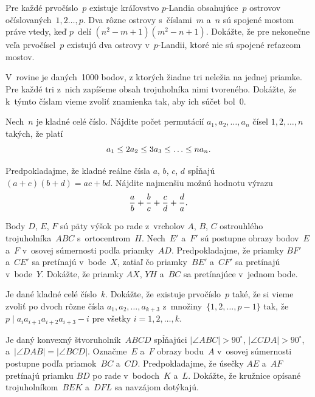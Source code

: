 {%

Pre každé prvočíslo~$p$ existuje kráľovstvo $p$-Landia obsahujúce~$p$ ostrovov očíslovaných~$1,2\ldots,p$. Dva rôzne ostrovy s~číslami~$m$ a~$n$ sú spojené mostom práve vtedy, keď $p$~delí $(n^2-m+1)(m^2-n+1)$. Dokážte, že pre nekonečne veľa prvočísel~$p$ existujú dva ostrovy v~$p$-Landii, ktoré nie sú spojené reťazcom mostov.
}

{%

V~rovine je daných~1000 bodov, z ktorých žiadne tri neležia na jednej priamke. Pre každé tri z~nich zapíšeme obsah trojuholníka nimi tvoreného. Dokážte, že k~týmto číslam vieme zvoliť znamienka tak, aby ich súčet bol~0.
}

{%

Nech~$n$ je kladné celé číslo. Nájdite počet permutácií $a_1,a_2,\ldots,a_n$ čísel $1,2,\ldots,n$ takých, že platí
$$
a_1 \leq 2a_2 \leq 3a_3 \leq \ldots \leq n a_n.
\belowdisplayskip0pt
$$
}

{%

Predpokladajme, že kladné reálne čísla $a$, $b$, $c$, $d$ spĺňajú $(a+c)(b+d) = ac + bd$. Nájdite najmenšiu možnú hodnotu výrazu
$$
\frac ab + \frac bc + \frac cd + \frac da.
\belowdisplayskip0pt
$$
}

{%

Body $D$, $E$, $F$ sú päty výšok po rade z~vrcholov $A$, $B$, $C$ ostrouhlého trojuholníka~$ABC$ s~ortocentrom~$H$. Nech~$E'$ a~$F'$ sú postupne obrazy bodov~$E$ a~$F$ v~osovej súmernosti podľa priamky~$AD$. Predpokladajme, že priamky $BF'$ a~$CE'$ sa pretínajú v~bode~$X$, zatiaľ čo priamky~$BE'$ a~$CF'$ sa pretínajú v~bode~$Y$. Dokážte, že priamky $AX$, $YH$ a~$BC$ sa pretínajúce v~jednom bode.
}

{%

Je dané kladné celé číslo~$k$. Dokážte, že existuje prvočíslo~$p$ také, že si vieme zvoliť po dvoch rôzne čísla $a_1,a_2,\ldots,a_{k+3}$ z~množiny~$\{1,2,\ldots,p-1\}$ tak, že $p \mid a_ia_{i+1}a_{i+2}a_{i+3}-i$ pre všetky $i=1,2,\ldots,k$.
}

{%

Je daný konvexný štvoruholník~$ABCD$ spĺňajúci $|\angle ABC|>90^\circ$, $|\angle CDA|>90^\circ$, a~$|\angle DAB|=|\angle BCD|$. Označme~$E$ a~$F$ obrazy bodu~$A$ v~osovej súmernosti postupne podľa priamok~$BC$ a~$CD$. Predpokladajme, že úsečky $AE$ a~$AF$ pretínajú priamku $BD$ po rade v~bodoch~$K$ a~$L$. Dokážte, že kružnice opísané trojuholníkom~$BEK$ a~$DFL$ sa navzájom dotýkajú.
}

